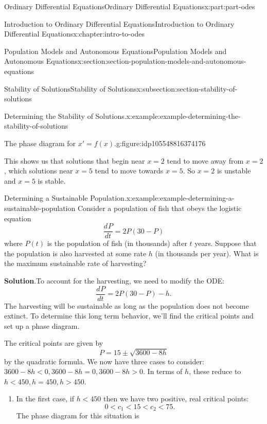 \documentclass[twoside,10pt,]{book}
\newcommand{\blocktitlefont}{\relax}
\numberwithin{equation}{part}
\providecommand{\dv}[3][]{\dfrac{d^{#1} #2}{d #3^{#1}}}
\newcommand{\lt}{<}
\newcommand{\gt}{>}
\begin{document}
\begin{partptx}{Ordinary Differential Equations}{}{Ordinary Differential Equations}{}{}{x:part:part-odes}
\begin{chapterptx}{Introduction to Ordinary Differential Equations}{}{Introduction to Ordinary Differential Equations}{}{}{x:chapter:intro-to-odes}
\begin{sectionptx}{Population Models and Autonomous Equations}{}{Population Models and Autonomous Equations}{}{}{x:section:section-population-models-and-autonomous-equations}
\begin{subsectionptx}{Stability of Solutions}{}{Stability of Solutions}{}{}{x:subsection:section-stability-of-solutions}
\begin{example}{Determining the Stability of Solutions.}{x:example:example-determining-the-stability-of-solutions}
\begin{figureptx}{The phase diagram for \(x' = f(x).\)}{g:figure:idp105548816374176}{}
\begin{image}{0.25}{0.5}{0.25}
{
}%
\end{image}%
\tcblower
\end{figureptx}%
This shows us that solutions that begin near \(x = 2\) tend to move away from \(x = 2\), which solutions near \(x = 5\) tend to move towards \(x = 5\). So \(x = 2\) is unstable and \(x = 5\) is stable.%
\end{example}
\begin{example}{Determining a Sustainable Population.}{x:example:example-determining-a-sustainable-population}%
Consider a population of fish that obeys the logistic equation%
\begin{equation*}
\dv{P}{t} = 2P(30 - P)
\end{equation*}
where \(P(t)\) is the population of fish (in thousands) after \(t\) years. Suppose that the population is also harvested at some rate \(h\) (in thousands per year). What is the maximum sustainable rate of harvesting?%
\par\smallskip%
\noindent\textbf{\blocktitlefont Solution}.\hypertarget{g:solution:idp105548816380576}{}\quad{}To account for the harvesting, we need to modify the ODE:%
\begin{equation*}
\dv{P}{t} = 2P(30 - P) - h.
\end{equation*}
The harvesting will be sustainable as long as the population does not become extinct. To determine this long term behavior, we'll find the critical points and set up a phase diagram.%
\par
The critical points are given by%
\begin{equation*}
P = 15 \pm \sqrt{3600 - 8h}
\end{equation*}
by the quadratic formula. We now have three cases to consider: \(3600 - 8h \lt 0, 3600 - 8h = 0, 3600 - 8h \gt 0.\) In terms of \(h\), these reduce to \(h \lt 450, h = 450, h \gt 450\).%
%
\begin{enumerate}
\item{}In the first case, if \(h \lt 450\) then we have two positive, real critical points:%
\begin{equation*}
0 \lt c_{1} \lt 15 \lt c_{2} \lt 75.
\end{equation*}
The phase diagram for this situation is%

\end{enumerate}
\end{example}
\end{subsectionptx}
\end{sectionptx}
\end{chapterptx}
\end{partptx}
\end{document}
